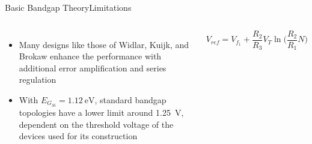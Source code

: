 \documentclass[aspectratio=1610]{beamer} %
\begin{document}
\begin{frame}{Basic Bandgap Theory}{Limitations}

    \begin{columns}[c]
        \begin{itemize}
            \item Many designs like those of Widlar, Kuijk, and Brokaw enhance the performance with additional error amplification and series regulation
            \item With \(E_{G_{Si}} = \qty{1.12}{\eV}\), standard bandgap topologies have a lower limit around \qty{1.25}{\V}, dependent on the threshold voltage of the devices used for its construction~\cite{Razavi2016}
        \end{itemize}
        \vspace*{-4pt}
        \small
        \begin{equation}
            V_{ref} = V_{f_1} + \frac{R_2}{R_3}V_T\ln\Biggl(\frac{R_2}{R_1}N\Biggr)
        \label{eq:conv_vout}
        \end{equation}
    

\end{columns}
\end{frame}
\end{document}
